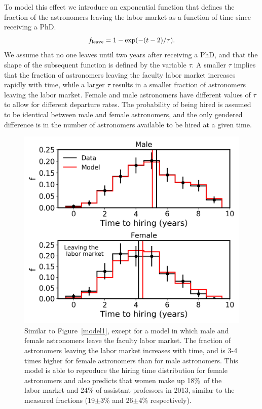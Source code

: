 \documentclass[modern]{aastex62}
\begin{document}
To model this effect we introduce an exponential function that defines the fraction of the astronomers leaving the labor market as a function of time since receiving a PhD.
\begin{equation}
f_{\rm leave} = 1-\exp (-(t-2)/\tau).
\end{equation}
We assume that no one leaves until two years after receiving a PhD, and that the shape of the subsequent function is defined by the variable $\tau$. A smaller $\tau$ implies that the fraction of astronomers leaving the faculty labor market increases rapidly with time, while a larger $\tau$ results in a smaller fraction of astronomers leaving the labor market. Female and male astronomers have different values of $\tau$ to allow for different departure rates. The probability of being hired is assumed to be identical between male and female astronomers, and the only gendered difference is in the number of astronomers available to be hired at a given time. 

\begin{figure}[!hbt]
\center
\includegraphics[scale=.6]{model3.png}
\caption{Similar to Figure~\ref{model1}, except for a model in which male and female astronomers leave the faculty labor market. The fraction of astronomers leaving the labor market increases with time, and is 3-4 times higher for female astronomers than for male astronomers. This model is able to reproduce the hiring time distribution for female astronomers and also predicts that women make up 18\%\ of the labor market and 24\% of assistant professors in 2013, similar to the measured fractions (19$\pm$3\% and 26$\pm$4\% respectively).  \label{model3}}
\end{figure}
\end{document}
